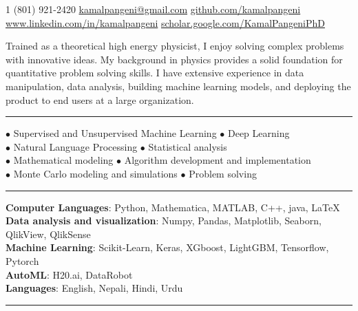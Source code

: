 \documentclass[10pt,letterpaper]{article}
\begin{document}

\noindent\textsmaller{+}1 (801) 921-2420\bull
\href{mailto:kamalpangeni@gmail.com}{kamalpangeni@gmail.com}\bull
\href{https://github.com/kamalpangeni}
{github.com/kamalpangeni}\\
\href{https://www.linkedin.com/in/kamal-pangeni-31242a29/}
{www.linkedin.com/in/kamalpangeni}\bull
\href{https://scholar.google.com/citations?user=MJPS73gAAAAJ&hl=en}
{scholar.google.com/\textsmaller{+}KamalPangeniPhD}

\spacedhrule{0.9em}{-0.4em}

Trained as a theoretical high energy physicist, I enjoy solving complex problems with innovative ideas. My background in physics provides a solid foundation for quantitative problem solving skills. I have extensive experience in data manipulation, data analysis, building machine learning models, and deploying the product to end users at a large organization.\\
\hrule
 $\bullet$ Supervised and Unsupervised Machine Learning \hspace{2.6cm}
 $\bullet$ Deep Learning\\
 $\bullet$ Natural Language Processing\hspace{5.4cm}
 $\bullet$ Statistical analysis\\
 $\bullet$ Mathematical modeling \hspace{6.1cm}
 $\bullet$ Algorithm development and implementation\\
 $\bullet$ Monte Carlo modeling and simulations \hspace{3.95cm}
 $\bullet$ Problem solving
 
\hrule
{}
\textbf{Computer Languages}: Python, Mathematica, MATLAB, C++, java, \LaTeX \\
\textbf{Data analysis and visualization}: Numpy, Pandas, Matplotlib, Seaborn, QlikView, QlikSense\\
\textbf{ Machine Learning}: Scikit-Learn, Keras, XGboost, LightGBM, Tensorflow, Pytorch\\
\textbf{ AutoML}: H20.ai, DataRobot\\
\textbf{Languages}: English, Nepali, Hindi, Urdu\\
\hrule
\end{document}
